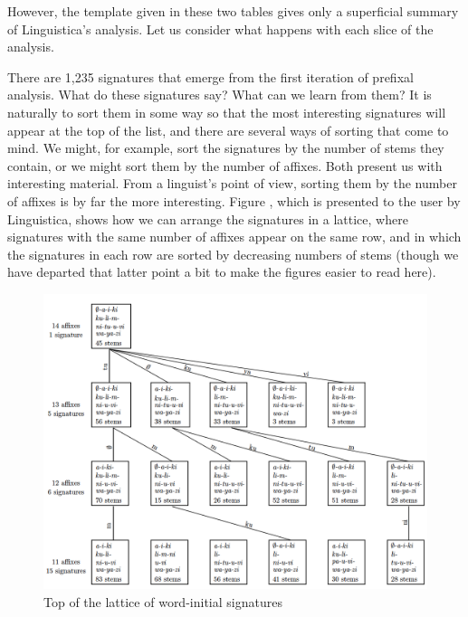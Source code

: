 \documentclass[output=paper,colorlinks,citecolor=brown,
]{langscibook}
\begin{document}
 
However, the template given in these two tables gives only a superficial summary of Linguistica's analysis. Let us consider what happens with each slice of the analysis.

 
There are 1,235 signatures that emerge from the first iteration of prefixal analysis. What do these signatures say? What can we learn from them? It is naturally to sort them in some way so that the most interesting signatures will appear at the top of the list, and there are several ways of sorting that come to mind. We might, for example, sort the signatures by the number of stems they contain, or we might sort them by the number of affixes. Both present us with interesting material. From a linguist's point of view, sorting them by the number of affixes is by far the more interesting. Figure , which is presented to the user by Linguistica, shows how we can arrange the signatures in a lattice, where signatures with the same number of affixes appear on the same row, and in which the signatures in each row are sorted by decreasing numbers of stems (though we have departed that latter point a bit to make the figures easier to read here). 
 
\begin{figure}
\includegraphics[scale=0.7]{../figures/top_of_lattice.png}
\caption{Top of the lattice of word-initial signatures}
\label{lattice}
\end{figure}

\end{document}

